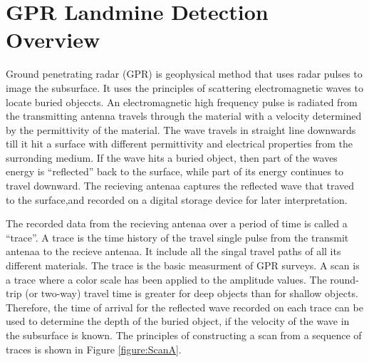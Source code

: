 \documentclass[conference]{IEEEtran}
\begin{document}

\section{GPR Landmine Detection Overview}
\label{sec:gpr}


 Ground penetrating radar (GPR) is geophysical method that uses radar pulses to image the subsurface. It uses the principles of scattering electromagnetic waves to locate buried objeccts. An electromagnetic high frequency pulse is radiated from the transmitting antenna travels through the material with a velocity determined by the permittivity of the material. The wave travels in straight line downwards till it hit a surface with different permittivity and electrical properties from the surronding medium. If the wave hits a buried object, then part of the waves energy is “reflected” back to the surface, while part of its energy continues to travel downward. The recieving antenaa captures the reflected wave that traved to the surface,and recorded on a digital storage device for later interpretation.

The recorded data from the recieving antenaa over a period of time is called a “trace”. A trace is the time history of the travel single pulse from the transmit antenaa to the recieve antenaa. It include all the singal travel paths of all its different materials. The trace is the basic measurment of GPR surveys.  A scan is a trace where a color scale has been applied to the amplitude values. The round-trip (or two-way) travel time is greater for deep objects than for shallow objects. Therefore, the time of arrival for the reflected wave recorded on each trace can be used to determine the depth of the buried object, if the velocity of the wave in the subsurface is known. The principles of constructing a scan from a sequence of traces is shown in Figure \ref{figure:ScanA}.
\end{document}
